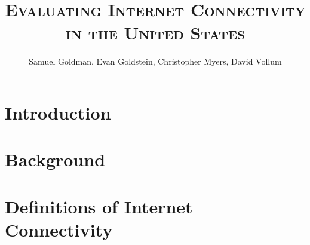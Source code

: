 \documentclass[12pt,oneside,letterpaper]{memoir}
\title{\scshape Evaluating Internet Connectivity in the United States}
\author{Samuel Goldman, Evan Goldstein, Christopher Myers, David Vollum}
\begin{document}
    
    \frontmatter
    \maketitle
    \newpage
    
    
    \newpage
    
    \tableofcontents\newpage
    \listoffigures\newpage
    \listoftables\newpage
    
    \pagestyle{headings}
    \mainmatter
    
    
    
    \chapter{Introduction}\label{sec:introduction}
    
    
    \acresetall
    \newpage
    \chapter{Background}\label{sec:background}
    
    
    
    
    
    
    
    
    
    
    \newpage
    \chapter{Definitions of Internet Connectivity}\label{sec:connectivity_defs}
    
    
\end{document}
